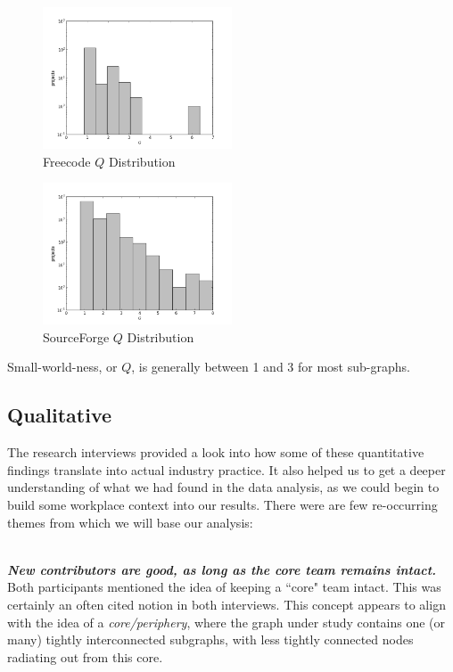 \documentclass{proc}
\begin{document}
\begin{figure}
\begin{center}
\includegraphics[width=0.5\textwidth]{images/freecode-q-histo.png}
\end{center}
\caption{Freecode $Q$ Distribution}
\label{fig:q_fc_distribution}
\end{figure}

\begin{figure}
\begin{center}
\includegraphics[width=0.5\textwidth]{images/sf-q-histo.png}
\end{center}
\caption{SourceForge $Q$ Distribution}
\label{fig:q_sf_distribution}
\end{figure}

Small-world-ness, or $Q$, is generally between 1 and 3 for most sub-graphs.

\subsection{Qualitative}
The research interviews provided a look into how some of these quantitative findings translate into actual industry practice. It also helped us to get a deeper understanding of what we had found in the data analysis, as we could begin to build some workplace context into our results. There were are few re-occurring themes from which we will base our analysis\cite{stmartin_interview,rana_interview}:

\noindent\\\textit{\textbf{New contributors are good, as long as the core team remains intact.}}\\
Both participants mentioned the idea of keeping a ``core" team intact. This was certainly an often cited notion in both interviews. This concept appears to align with the idea of a \textit{core/periphery}\cite{borgatti2000models}, where the graph under study contains one (or many) tightly interconnected subgraphs, with less tightly connected nodes radiating out from this core.
\end{document}
